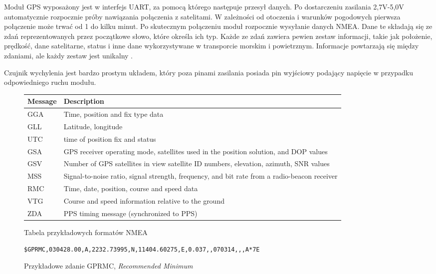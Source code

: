 \documentclass[eng,printmode]{mgr}
\begin{document}
Moduł GPS wyposażony jest w interfejs UART, za pomocą którego następuje przesył danych. Po dostarczeniu zasilania 2,7V-5,0V automatycznie rozpocznie próby nawiązania połączenia z satelitami. W zależności od otoczenia i warunków pogodowych pierwsza połączenie może trwać od 1 do kilku minut. Po skutecznym połączeniu moduł rozpocznie wysyłanie danych NMEA. Dane te składają się ze zdań reprezentowanych przez początkowe słowo, które określa ich typ. Każde ze zdań zawiera pewien zestaw informacji, takie jak położenie, prędkość, dane satelitarne, status i inne dane wykorzystywane w transporcie morskim i powietrznym. Informacje powtarzają się między zdaniami, ale każdy zestaw jest unikalny \cite{nmea}.

Czujnik wychylenia jest bardzo prostym układem, który poza pinami zasilania posiada pin wyjściowy podający napięcie w przypadku odpowiedniego ruchu modułu.

\begin{figure}

\begin{center}
    \begin{tabular}{ | p{2cm} | p{13cm} |}
    \hline
    Message & Description \\ \hline
    GGA & Time, position and fix type data \\
    GLL & Latitude, longitude\\
    UTC & time of position fix and status \\
    GSA & GPS receiver operating mode, satellites used in the position solution, and DOP values \\
    GSV & Number of GPS satellites in view satellite ID numbers, elevation, azimuth, SNR values \\
    MSS & Signal-to-noise ratio, signal strength, frequency, and bit rate from a radio-beacon receiver \\
    RMC & Time, date, position, course and speed data \\
    VTG & Course and speed information relative to the ground \\
    ZDA & PPS timing message (synchronized to PPS) \\

    \hline
    \end{tabular}
    \end{center}
	\caption{Tabela przykładowych formatów NMEA \cite{nmea_table}}
\end{figure}

\begin{figure}
\begin{lstlisting}[breaklines]
  $GPRMC,030428.00,A,2232.73995,N,11404.60275,E,0.037,,070314,,,A*7E
\end{lstlisting}
\caption{Przykładowe zdanie GPRMC, \textit{Recommended Minimum}}
\end{figure}
\end{document}
